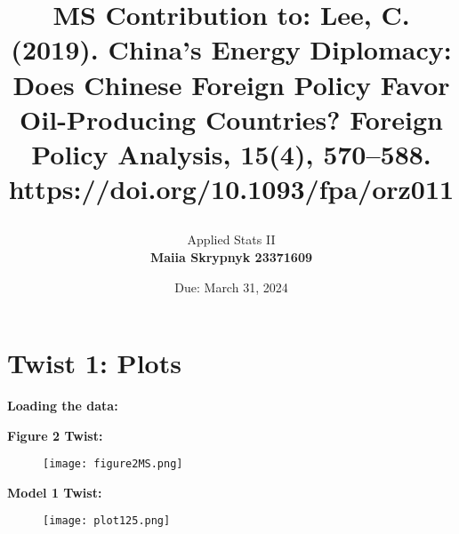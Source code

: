 \documentclass[12pt,letterpaper]{article}
\title{\textbf{MS Contribution to:} Lee, C. (2019). China’s Energy Diplomacy: Does Chinese Foreign Policy Favor Oil-Producing Countries? Foreign Policy Analysis, 15(4), 570–588. https://doi.org/10.1093/fpa/orz011

}
\date{Due: March 31, 2024}
\author{Applied Stats II \\ \vspace{\baselineskip}
	\textbf{Maiia Skrypnyk 23371609}}
\begin{document}
	\maketitle

\section{Twist 1: Plots}

\textbf{Loading the data:}
 


\noindent \textbf{Figure 2 Twist:}

  


\begin{figure}[H]
    \centering
    \texttt{[image: figure2MS.png]}
\end{figure}

\newpage
\textbf{Model 1 Twist:}

  

\begin{figure}[H]
    \centering
    \texttt{[image: plot125.png]}
\end{figure}

  
\end{document}
